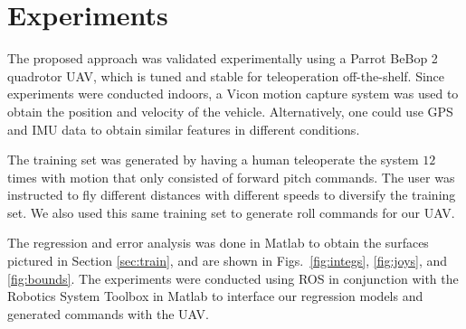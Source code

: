 \documentclass[letterpaper, 10 pt, conference]{ieeeconf}  %
\begin{document}
\section{Experiments} \label{sec:exper}

The proposed approach was validated experimentally using a Parrot BeBop 2 quadrotor UAV, which is tuned and stable for teleoperation off-the-shelf. Since experiments were conducted indoors, a Vicon motion capture system was used to obtain the position and velocity of the vehicle. Alternatively, one could use GPS and IMU data to obtain similar features in different conditions. 

The training set was generated by having a human teleoperate the system $12$ times with motion that only consisted of forward pitch commands. The user was instructed to fly different distances with different speeds to diversify the training set. We also used this same training set to generate roll commands for our UAV.

The regression and error analysis was done in Matlab to obtain the surfaces pictured in Section \ref{sec:train}, and are shown in Figs.~\ref{fig:integs}, \ref{fig:joys}, and \ref{fig:bounds}. The experiments were conducted using ROS in conjunction with the Robotics System Toolbox in Matlab to interface our regression models and generated commands with the UAV.
\end{document}
